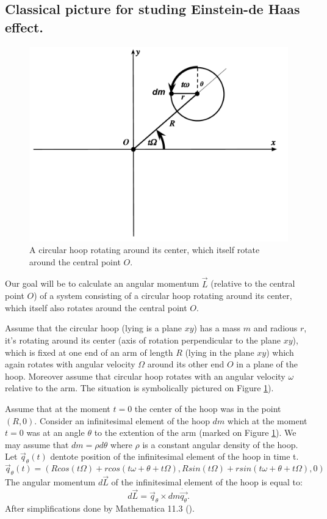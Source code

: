 \documentclass[main.tex]{subfiles}
\begin{document}
\subsection{Classical picture for studing Einstein-de Haas effect.}
\begin{figure}[H]

\centering
\includegraphics[scale=0.5]{figs/Angular}
\caption{A circular hoop rotating around its center, which itself rotate around the central point $O$.}
\label{fig:hoop}
\end{figure}
Our goal will be to calculate an angular momentum $\vec{L}$ (relative to the central point $O$) of a system consisting of a circular hoop rotating around its center, which itself also rotates around the central point $O$.

Assume that the circular hoop (lying is a plane $xy$) has a mass $m$ and radious $r$, it's rotating around its center (axis of rotation perpendicular to the plane $xy$), which is fixed at one end of an arm of length $R$ (lying in the plane $xy$) which again rotates with angular velocity $\Omega$ around its other end $O$ in a plane of the hoop. Moreover assume that circular hoop rotates with an angular velocity $\omega$ relative to the arm. The situation is symbolically pictured on Figure \ref{fig:hoop}).

Assume that at the moment $t=0$ the center of the hoop was in the point $(R, 0)$.
Consider an infinitesimal element of the hoop $dm$ which at the moment $t=0$ was at an angle $\theta$ to the extention of the arm (marked on Figure \ref{fig:hoop}). We may assume that $dm = \rho d\theta$ where $\rho$ is a constant angular density of the hoop. Let $\vec{q}_\theta(t)$ dentote position of the infinitesimal element of the hoop in time t.
\begin{equation}
\vec{q}_\theta(t) = (Rcos(t\Omega) + rcos(t\omega + \theta + t\Omega), Rsin(t\Omega) + rsin(t\omega + \theta + t\Omega),0)
\end{equation}
The angular momentum $d\vec{L}$ of the infinitesimal element of the hoop is equal to:
\begin{equation}
d\vec{L} = \vec{q}_\theta \times dm \dot{\vec{q_\theta}}.
\end{equation}
After simplifications done by Mathematica 11.3 (\cite{mathematica2018}).
\end{document}
